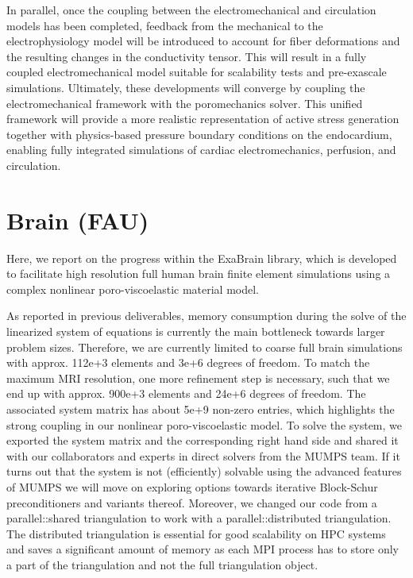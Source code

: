 \documentclass[a4paper,12pt]{article}
\begin{document}
In parallel, once the coupling between the electromechanical and circulation models has been completed, feedback from the mechanical to the electrophysiology model will be introduced to account for fiber deformations and the resulting changes in the conductivity tensor. This will result in a fully coupled electromechanical model suitable for scalability tests and pre-exascale simulations.
Ultimately, these developments will converge by coupling the electromechanical framework with the poromechanics solver. This unified framework will provide a more realistic representation of active stress generation together with physics-based pressure boundary conditions on the endocardium, enabling fully integrated simulations of cardiac electromechanics, perfusion, and circulation.



\section{Brain (FAU)}\label{sec:fau}

Here, we report on the progress within the ExaBrain library, which is developed to facilitate high resolution full human brain finite element simulations using a complex nonlinear poro-viscoelastic material model.
 
As reported in previous deliverables, memory consumption during the solve of the linearized system of equations is currently the main bottleneck towards larger problem sizes. Therefore, we are currently limited to coarse full brain simulations with approx. 112e+3 elements and 3e+6 degrees of freedom. To match the maximum MRI resolution, one more refinement step is necessary, such that we end up with approx. 900e+3 elements and 24e+6 degrees of freedom. The associated system matrix has about 5e+9 non-zero entries, which highlights the strong coupling in our nonlinear poro-viscoelastic model. To solve the system, we exported the system matrix and the corresponding right hand side and shared it with our collaborators and experts in direct solvers from the MUMPS team. If it turns out that the system is not (efficiently) solvable using the advanced features of MUMPS we will move on exploring options towards iterative Block-Schur preconditioners and variants thereof. Moreover, we changed our code from a parallel::shared triangulation to work with a parallel::distributed triangulation. The distributed triangulation is essential for good scalability on HPC systems and saves a significant amount of memory as each MPI process has to store only a part of the triangulation and not the full triangulation object. 
\end{document}
